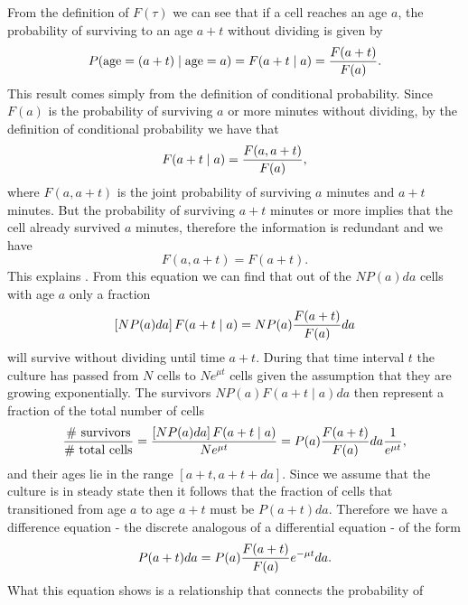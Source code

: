 From the definition of $F(\tau)$ we can see that if a cell reaches an age $a$,
the probability of surviving to an age $a + t$ without dividing is given by
\begin{equation}
  P(\text{age} = (a + t) \mid \text{age} = a) = F(a + t \mid a) =
  {F(a + t) \over F(a)}.
  \label{seq_prob_a+t_give_a}
\end{equation}
This result comes simply from the definition of conditional probability. Since
$F(a)$ is the probability of surviving $a$ or more minutes without dividing, by
the definition of conditional probability we have that
\begin{equation}
  F(a + t \mid a) = {F(a, a + t) \over F(a)},
\end{equation}
where $F(a, a + t)$ is the joint probability of surviving $a$ minutes and $a +
t$ minutes. But the probability of surviving $a + t$ minutes or more implies
that the cell already survived $a$ minutes, therefore the information is
redundant and we have
\begin{equation}
  F(a, a + t) = F(a + t).
\end{equation}
This explains . From this equation we can find that
out of the $N P(a)da$ cells with age $a$ only a fraction
\begin{equation}
  \left[ NP(a)da \right] F(a + t \mid a) = NP(a) {F(a + t)\over F(a)} da
\end{equation}
will survive without dividing until time $a + t$. During that time interval $t$
the culture has passed from $N$ cells to $N e^{\mu t}$ cells given the
assumption that they are growing exponentially. The survivors $NP(a)F(a + t \mid
a)da$ then represent a fraction of the total number of cells
\begin{equation}
  {\text{\# survivors} \over \text{\# total cells}} =
  {\left[ NP(a)da \right] F(a + t \mid a) \over Ne^{\mu t}} =
  P(a){F(a + t)\over F(a)}da {1 \over e^{\mu t}},
\end{equation}
and their ages lie in the range $[a+t, a+t+da]$. Since we assume that the
culture is in steady state then it follows that the fraction of cells that
transitioned from age $a$ to age $a + t$ must be $P(a + t)da$. Therefore we have
a difference equation - the discrete analogous of a differential equation - of
the form
\begin{equation}
  P(a + t) da = P(a) {F(a + t) \over F(a)}e^{-\mu t} da.
  \label{seq_difference_eq}
\end{equation}
What this equation shows is a relationship that connects the probability of
